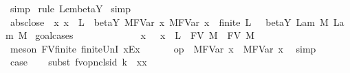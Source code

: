 \begin{isabellebody}
\ simp\isanewline
{}\isamarkupfalse%
\ {\isacharparenleft}rule\ Lem{}{\isacharunderscore}{}{\isacharunderscore}{}{\isacharprime}{\isacharunderscore}beta{\isacharunderscore}Y{\isacharparenright}\isanewline
{}\isamarkupfalse%
\ simp%
\endisatagproof
{\isafoldproof}%
%
\isadelimproof
\isanewline
%
\endisadelimproof
\isanewline
{}\isamarkupfalse%
\ abs{\isacharunderscore}close{\isacharcolon}\ {\isachardoublequoteopen}{\isasymlbrakk}\ {\isasymAnd}x{\isachardot}\ x\ {\isasymnotin}\ L\ {\isasymLongrightarrow}\ beta{\isacharunderscore}Y{\isacharasterisk}\ {\isacharparenleft}M{\isacharcircum}FVar\ x{\isacharparenright}\ {\isacharparenleft}M{\isacharprime}{\isacharcircum}FVar\ x{\isacharparenright}\ {\isacharsemicolon}\ finite\ L\ {\isasymrbrakk}\ {\isasymLongrightarrow}\ beta{\isacharunderscore}Y{\isacharasterisk}\ {\isacharparenleft}Lam\ M{\isacharparenright}\ {\isacharparenleft}Lam\ M{\isacharprime}{\isacharparenright}{\isachardoublequoteclose}\isanewline
%
\isadelimproof
%
\endisadelimproof
%
\isatagproof
{}\isamarkupfalse%
\ goal{\isacharunderscore}cases\isanewline
{}\isamarkupfalse%
\ {}\isanewline
\ \ \isamarkupfalse%
\ {}{}\ {\isacharequal}\ {}\isanewline
\ \ \isamarkupfalse%
\ \isamarkupfalse%
\ x\ \ {}{\isacharcolon}\ {\isachardoublequoteopen}x\ {\isasymnotin}\ L\ {\isasymunion}\ FV\ M\ {\isasymunion}\ FV\ M{\isacharprime}{\isachardoublequoteclose}\ \isamarkupfalse%
\ {\isacharparenleft}meson\ FV{\isacharunderscore}finite\ finite{\isacharunderscore}UnI\ x{\isacharunderscore}Ex{\isacharparenright}\isanewline
\ \ \isamarkupfalse%
\ {}\ \isamarkupfalse%
\ {\isachardoublequoteopen}op\ {\isasymRightarrow}{\isacharasterisk}\ M{\isacharcircum}FVar\ x\ \ M{\isacharprime}{\isacharcircum}FVar\ x{\isachardoublequoteclose}\ \isamarkupfalse%
\ simp\isanewline
\ \ \isamarkupfalse%
\ \isamarkupfalse%
\ {\isacharquery}case\isanewline
\ \ \isamarkupfalse%
\ {\isacharparenleft}subst\ {\isacharparenleft}{}{\isacharparenright}fv{\isacharunderscore}opn{\isacharunderscore}cls{\isacharunderscore}id{}{\isacharbrackleft}\ k{\isacharequal}{}\ \ x{\isacharequal}x{\isacharbrackright}{\isacharparenright}\isanewline
\ \ \isamarkupfalse%

\end{isabellebody}
